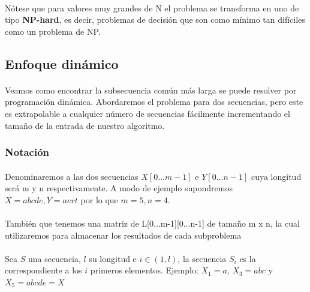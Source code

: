\documentclass{article}
\begin{document}
		\paragraph{}
		Nótese que para valores muy grandes de N el problema se transforma en uno de tipo \textbf{NP-hard}, es decir, problemas de decisión que son como mínimo tan difíciles como un problema de NP.

	\subsection{Enfoque dinámico}

		\paragraph{}
		Veamos como encontrar la subsecuencia común más larga se puede resolver por programación dinámica. Abordaremos el problema para dos secuencias, pero este es extrapolable a cualquier número de secuencias fácilmente incrementando el tamaño de la entrada de nuestro algoritmo.

		\subsubsection{Notación}

			\paragraph{}
			Denominaremos a las dos secuencias $X[0...m-1]$ e $Y[0...n-1]$ cuya longitud será m y n respectivamente. 		
			\newline{}
			A modo de ejemplo supondremos $X = abcde, Y = aert$ por lo que $m = 5, n = 4$.
			
			\paragraph{}
			También que tenemos una matriz de L[0...m-1][0...n-1] de tamaño m x n, la cual  utilizaremos para almacenar los resultados de cada subproblema
			
			\paragraph{}
			Sea $S$ una secuencia, $l$ su longitud  e $i \in (1, l)$, la secuencia $S_{i}$ es la correspondiente a los $i$ primeros elementos. 
			\newline{}
			Ejemplo: $X_{1} = a$, $X_{3} = abc$ y $X_{5} = abcde = X$
			
\end{document}
